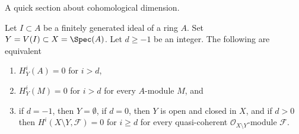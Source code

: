\noindent
A quick section about cohomological dimension.

\begin{lemma}
\label{lemma-cd}
Let $I \subset A$ be a finitely generated ideal of a ring $A$.
Set $Y = V(I) \subset X = \Spec(A)$. Let $d \geq -1$ be an integer.
The following are equivalent
\begin{enumerate}
\item $H^i_Y(A) = 0$ for $i > d$,
\item $H^i_Y(M) = 0$ for $i > d$ for every $A$-module $M$, and
\item if $d = -1$, then $Y = \emptyset$, if $d = 0$, then
$Y$ is open and closed in $X$, and if $d > 0$ then
$H^i(X \setminus Y, \mathcal{F}) = 0$ for $i \geq d$
for every quasi-coherent $\mathcal{O}_{X \setminus Y}$-module $\mathcal{F}$.
\end{enumerate}
\end{lemma}

